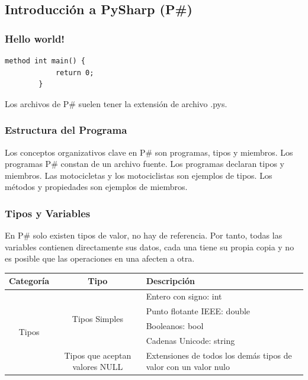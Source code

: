 \documentclass[12pt, letterpaper,spanish]{article}
\theoremstyle{definition}
\theoremstyle{remark}
\begin{document}
	\subsection{Introducción a PySharp (P\#)}
	\subsubsection{Hello world!}
	
	\begin{lstlisting}[language={PySharp}]
		method int main() {
			return 0;
		}
	\end{lstlisting}	
	Los archivos de P\# suelen tener la extensión de archivo .pys.\par
	
	\subsubsection{Estructura del Programa}
	Los conceptos organizativos clave en P\# son programas, tipos y miembros. Los programas P\# constan de un archivo fuente. Los programas declaran tipos y miembros. Las motocicletas y los motociclistas son ejemplos de tipos. Los métodos y propiedades son ejemplos de miembros.
	
	\subsubsection{Tipos y Variables}
	En P\# solo existen tipos de valor, no hay de referencia. Por tanto, todas las variables contienen directamente sus datos, cada una tiene su propia copia y no es posible que las operaciones en una afecten a otra.\par
	\begin{center}
		\begin{tabular}{| c | c | m{5cm} | }
			\hline
			Categoría & Tipo & Descripción \\ \hline
			\multirow{5}{*}{Tipos} & \multirow{4}{*}{Tipos Simples} & Entero con signo: int \\ \cline{3-3}
			&  & Punto flotante IEEE: double \\ \cline{3-3}
			&  & Booleanos: bool \\ \cline{3-3}
			&  & Cadenas Unicode: string \\ \cline{2-3}
			& Tipos que aceptan valores NULL & Extensiones de todos los demás tipos de valor con un valor nulo \\ \hline
		\end{tabular}
	\end{center}
\end{document}
